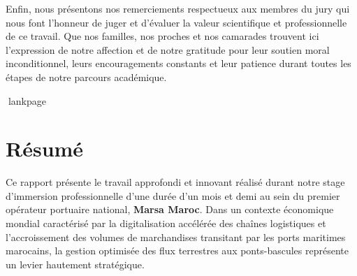 \documentclass[12pt,a4paper,oneside]{report}
\newcommand{\blankpage}{%
  \newpage
  \thispagestyle{empty}%
  \mbox{}%
  \newpage
}
\begin{document}
Enfin, nous présentons nos remerciements respectueux aux membres du jury qui nous font l'honneur de juger et d'évaluer la valeur scientifique et professionnelle de ce travail. Que nos familles, nos proches et nos camarades trouvent ici l'expression de notre affection et de notre gratitude pour leur soutien moral inconditionnel, leurs encouragements constants et leur patience durant toutes les étapes de notre parcours académique.

\newpage

lankpage
\blankpage

\chapter*{Résumé}

Ce rapport présente le travail approfondi et innovant réalisé durant notre stage d'immersion professionnelle d'une durée d'un mois et demi au sein du premier opérateur portuaire national, \textbf{Marsa Maroc}. Dans un contexte économique mondial caractérisé par la digitalisation accélérée des chaînes logistiques et l'accroissement des volumes de marchandises transitant par les ports maritimes marocains, la gestion optimisée des flux terrestres aux ponts-bascules représente un levier hautement stratégique.
\end{document}
